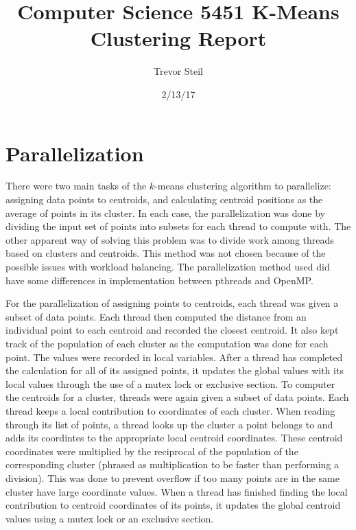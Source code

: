 \documentclass[a4paper]{article}
\title{Computer Science 5451 K-Means Clustering Report }
\date{2/13/17}
\author{Trevor Steil}
\begin{document}
\maketitle

\section{Parallelization}

There were two main tasks of the $k$-means clustering algorithm to parallelize: assigning data points to centroids, and calculating centroid positions
as the average of points in its cluster. In each case, the parallelization was done by dividing the input set of points into subsets for each thread
to compute with. The other apparent way of solving this problem was to divide work among threads based on clusters and centroids. This method was not
chosen because of the possible issues with workload balancing. The parallelization method used did have some differences in implementation between
pthreads and OpenMP.

For the parallelization of assigning points to centroids, each thread was given a subset of data points. Each thread then computed the distance from
an individual point to each centroid and recorded the closest centroid. It also kept track of the population of each cluster as the computation was
done for each point. The values were recorded in local variables. After a thread has completed the calculation for all of its assigned points, it
updates the global values with its local values through the use of a mutex lock or exclusive section. To computer the centroids for a cluster, threads
were again given a subset of data points. Each thread keeps a local contribution to coordinates of each cluster. When reading through its list of
points, a thread looks up the cluster a point belongs to and adds its coordintes to the appropriate local centroid coordinates. These centroid
coordinates were multiplied by the reciprocal of the population of the corresponding cluster (phrased as multiplication to be faster than performing a
division). This was done to prevent overflow if too many points are in the same cluster have large coordinate values. When a thread has finished
finding the local contribution to centroid coordinates of its points, it updates the global centroid values using a mutex lock or an exclusive
section.
\end{document}
